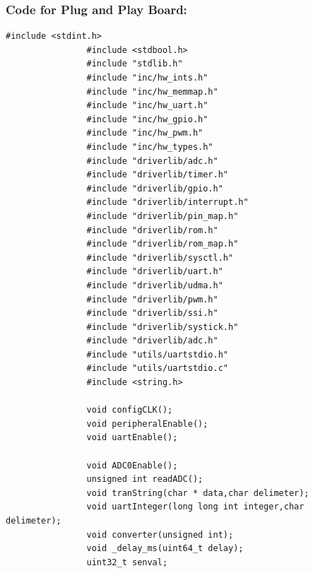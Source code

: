\documentclass[a4paper,10pt,oneside]{article}
\begin{document}
			\subsubsection{\textbf{Code for Plug and Play Board:}}
			\begin{lstlisting}[style=CStyle]
				#include <stdint.h>
				#include <stdbool.h>
				#include "stdlib.h"
				#include "inc/hw_ints.h"
				#include "inc/hw_memmap.h"
				#include "inc/hw_uart.h"
				#include "inc/hw_gpio.h"
				#include "inc/hw_pwm.h"
				#include "inc/hw_types.h"
				#include "driverlib/adc.h"
				#include "driverlib/timer.h"
				#include "driverlib/gpio.h"
				#include "driverlib/interrupt.h"
				#include "driverlib/pin_map.h"
				#include "driverlib/rom.h"
				#include "driverlib/rom_map.h"
				#include "driverlib/sysctl.h"
				#include "driverlib/uart.h"
				#include "driverlib/udma.h"
				#include "driverlib/pwm.h"
				#include "driverlib/ssi.h"
				#include "driverlib/systick.h"
				#include "driverlib/adc.h"
				#include "utils/uartstdio.h"
				#include "utils/uartstdio.c"
				#include <string.h>
				
				void configCLK();
				void peripheralEnable();
				void uartEnable();
				
				void ADC0Enable();
				unsigned int readADC();
				void tranString(char * data,char delimeter);
				void uartInteger(long long int integer,char delimeter);
				void converter(unsigned int);
				void _delay_ms(uint64_t delay);
				uint32_t senval;


\end{lstlisting}
\end{document}
